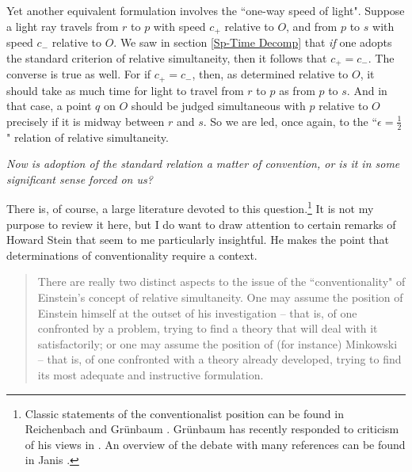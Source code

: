 \documentclass [12] {article}
\theoremstyle{plain}
\numberwithin{figure}{subsection}
\numberwithin{proposition}{subsection}
\begin{document}
Yet another equivalent formulation involves  the ``one-way speed of light".  Suppose a light ray travels from $r$ to $p$ with speed $c_{+}$ relative to $O$, and from $p$ to $s$ with speed $c_{-}$ relative to $O$. We saw in section \ref{Sp-Time Decomp} that \emph{if} one adopts the standard criterion of relative simultaneity, then it follows that $c_{+} = c_{-}$.  The converse is true as well.  For if  $c_{+} = c_{-}$, then, as determined relative to $O$, it should take as much time for light to travel from $r$ to $p$ as from $p$ to $s$. And in that case, a point $q$ on $O$ should be judged simultaneous with $p$ relative to $O$ precisely if it is midway between $r$ and $s$. So we are led, once again,  to the ``$\epsilon = \frac{1}{2}$" relation of relative simultaneity.   

\emph{Now is adoption of the standard relation a matter of convention,  or is it in some significant sense forced on us?}

 
There is, of course, a large literature devoted to this question.\footnote{Classic statements of the conventionalist position can be found in Reichenbach   and Gr\"unbaum .  Gr\"unbaum has recently responded to criticism of his views in . An overview of the debate with many references can be found in Janis . }  It is not my purpose to review it here,  but I do want to draw attention to certain remarks of Howard Stein  that seem to me particularly insightful. %
He makes the point that determinations of  conventionality require a context.  
 \begin{quote} 
There are really two distinct aspects to the issue of the ``conventionality" of Einstein's concept  of relative simultaneity. One may assume the position of Einstein himself at the outset of his investigation -- that is, of one confronted by a problem, trying to find a theory that will deal with it satisfactorily; or one may assume the position of (for instance) Minkowski -- that is, of one confronted with a theory already developed, trying to find its most adequate and instructive formulation.
\end{quote}  

\end{document}
